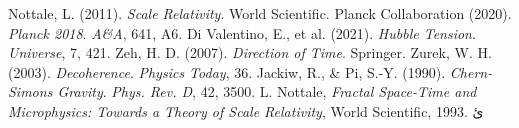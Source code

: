 \documentclass[aps,prl,twocolumn,groupedaddress]{revtex4-2}
\begin{document}
\begin{thebibliography}{9}
 Nottale, L. (2011). \textit{Scale Relativity}. World Scientific.
 Planck Collaboration (2020). \textit{Planck 2018}. \textit{A\&A}, 641, A6.
 Di Valentino, E., et al. (2021). \textit{Hubble Tension}. \textit{Universe}, 7, 421.
 Zeh, H. D. (2007). \textit{Direction of Time}. Springer.
 Zurek, W. H. (2003). \textit{Decoherence}. \textit{Physics Today}, 36.
 Jackiw, R., \& Pi, S.-Y. (1990). \textit{Chern-Simons Gravity}. \textit{Phys. Rev. D}, 42, 3500.
 L. Nottale, \textit{Fractal Space-Time and Microphysics: Towards a Theory of Scale Relativity}, World Scientific, 1993.
ئ\end{thebibliography}
\end{document}
